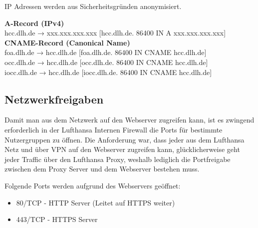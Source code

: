 	IP Adressen werden aus Sicherheitsgründen anonymisiert.

	\vspace{16pt}

	\textbf{A-Record (IPv4)}\\
	hcc.dlh.de → xxx.xxx.xxx.xxx [hcc.dlh.de. 86400 IN A xxx.xxx.xxx.xxx]\\

	\textbf{CNAME-Record (Canonical Name)}\\
	foa.dlh.de → hcc.dlh.de [foa.dlh.de. 86400 IN CNAME hcc.dlh.de]\\
	occ.dlh.de → hcc.dlh.de [occ.dlh.de. 86400 IN CNAME hcc.dlh.de]\\
	iocc.dlh.de → hcc.dlh.de [iocc.dlh.de. 86400 IN CNAME hcc.dlh.de]\\

	\subsection{Netzwerkfreigaben}
	Damit man aus dem Netzwerk auf den Webserver zugreifen kann, ist es zwingend erforderlich in der Lufthansa Internen Firewall die Ports für bestimmte Nutzergruppen zu öffnen.
	Die Anforderung war, dass jeder aus dem Lufthansa Netz und über VPN auf den Webserver zugreifen kann, glücklicherweise geht jeder Traffic über den Lufthansa Proxy, weshalb lediglich die Portfreigabe zwischen dem Proxy Server und dem Webserver bestehen muss.
	
	Folgende Ports werden aufgrund des Webservers geöffnet:

	\begin{itemize}
		\item 80/TCP - HTTP Server (Leitet auf HTTPS weiter)
		\item 443/TCP - HTTPS Server
	\end{itemize}